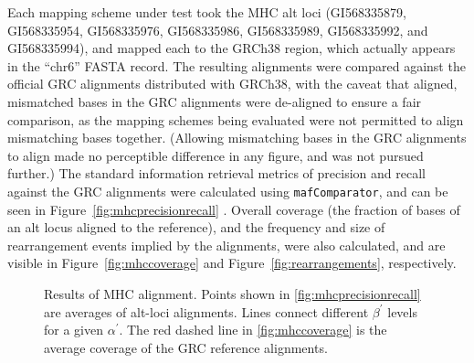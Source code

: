 Each mapping scheme under test took the MHC alt loci (GI568335879, GI568335954, GI568335976, GI568335986, GI568335989, GI568335992, and GI568335994), and mapped each to the GRCh38  region, which actually appears in the ``chr6'' FASTA record. The resulting alignments were compared against the official GRC alignments distributed with GRCh38, with the caveat that aligned, mismatched bases in the GRC alignments were de-aligned to ensure a fair comparison, as the mapping schemes being evaluated were not permitted to align mismatching bases together. (Allowing mismatching bases in the GRC alignments to align made no perceptible difference in any figure, and was not pursued further.) The standard information retrieval metrics of precision and recall against the GRC alignments were calculated using \texttt{mafComparator}, and can be seen in Figure~\ref{fig:mhcprecisionrecall} \citep{earl2014alignathon}. Overall coverage (the fraction of bases of an alt locus aligned to the reference), and the frequency and size of rearrangement events implied by the alignments, were also calculated, and are visible in Figure~\ref{fig:mhccoverage} and Figure~\ref{fig:rearrangements}, respectively.


\begin{figure}[t]
  \centering
  \caption{Results of MHC alignment. Points shown in \ref{fig:mhcprecisionrecall} are averages of alt-loci alignments. Lines connect different $\beta^\prime$ levels for a given $\alpha^\prime$. The red dashed line in \ref{fig:mhccoverage} is the average coverage of the GRC reference alignments.}
  \label{fig:mhc}
\end{figure}


